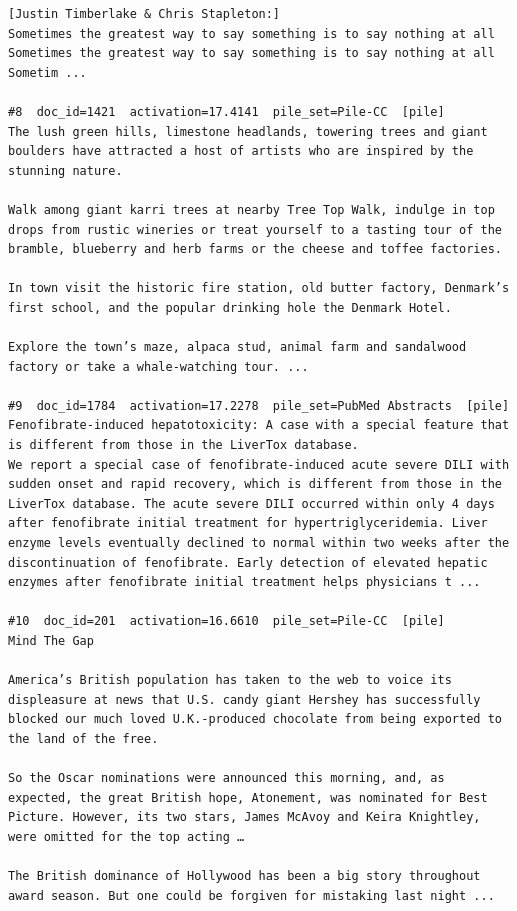 \begin{verbatim}
[Justin Timberlake & Chris Stapleton:]
Sometimes the greatest way to say something is to say nothing at all
Sometimes the greatest way to say something is to say nothing at all
Sometim ...

#8  doc_id=1421  activation=17.4141  pile_set=Pile-CC  [pile]
The lush green hills, limestone headlands, towering trees and giant boulders have attracted a host of artists who are inspired by the stunning nature.

Walk among giant karri trees at nearby Tree Top Walk, indulge in top drops from rustic wineries or treat yourself to a tasting tour of the bramble, blueberry and herb farms or the cheese and toffee factories.

In town visit the historic fire station, old butter factory, Denmark’s first school, and the popular drinking hole the Denmark Hotel.

Explore the town’s maze, alpaca stud, animal farm and sandalwood factory or take a whale-watching tour. ...

#9  doc_id=1784  activation=17.2278  pile_set=PubMed Abstracts  [pile]
Fenofibrate-induced hepatotoxicity: A case with a special feature that is different from those in the LiverTox database.
We report a special case of fenofibrate-induced acute severe DILI with sudden onset and rapid recovery, which is different from those in the LiverTox database. The acute severe DILI occurred within only 4 days after fenofibrate initial treatment for hypertriglyceridemia. Liver enzyme levels eventually declined to normal within two weeks after the discontinuation of fenofibrate. Early detection of elevated hepatic enzymes after fenofibrate initial treatment helps physicians t ...

#10  doc_id=201  activation=16.6610  pile_set=Pile-CC  [pile]
Mind The Gap

America’s British population has taken to the web to voice its displeasure at news that U.S. candy giant Hershey has successfully blocked our much loved U.K.-produced chocolate from being exported to the land of the free.

So the Oscar nominations were announced this morning, and, as expected, the great British hope, Atonement, was nominated for Best Picture. However, its two stars, James McAvoy and Keira Knightley, were omitted for the top acting …

The British dominance of Hollywood has been a big story throughout award season. But one could be forgiven for mistaking last night ...

\end{verbatim}

